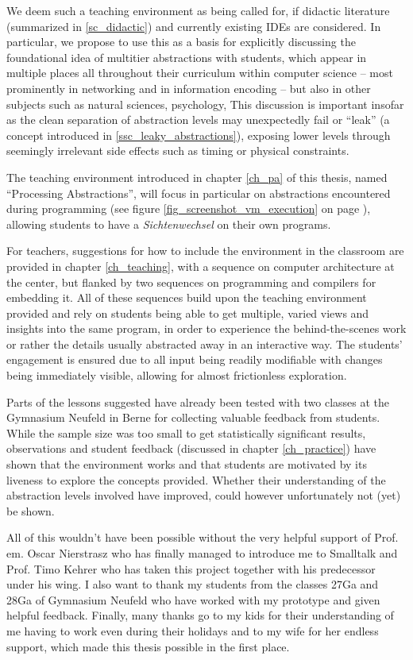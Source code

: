 We deem such a teaching environment as being called for, if didactic literature (summarized in \ref{sc_didactic}) and currently existing \acp{IDE} are considered. In particular, we propose to use this as a basis for explicitly discussing the foundational idea of multitier abstractions with students, which appear in multiple places all throughout their curriculum within computer science -- most prominently in networking and in information encoding -- but also in other subjects such as natural sciences, psychology, \etc This discussion is important insofar as the clean separation of abstraction levels may unexpectedly fail or ``leak'' (a concept introduced in \ref{ssc_leaky_abstractions}), exposing lower levels through seemingly irrelevant side effects such as timing or physical constraints.

The teaching environment introduced in chapter \ref{ch_pa} of this thesis, named ``Processing Abstractions'', will focus in particular on abstractions encountered during programming (see \eg figure \ref{fig_screenshot_vm_execution} on page \pageref{fig_screenshot_vm_execution}), allowing students to have a \emph{Sichtenwechsel} on their own programs.

For teachers, suggestions for how to include the environment in the classroom are provided in chapter \ref{ch_teaching}, with a sequence on computer architecture at the center, but flanked by two sequences on programming and compilers for embedding it. All of these sequences build upon the teaching environment provided and rely on students being able to get multiple, varied views and insights into the same program, in order to experience the behind-the-scenes work or rather the details usually abstracted away in an interactive way. The students' engagement is ensured due to all input being readily modifiable with changes being immediately visible, allowing for almost frictionless exploration.

Parts of the lessons suggested have already been tested with two classes at the Gymnasium Neufeld in Berne for collecting valuable feedback from students. While the sample size was too small to get statistically significant results, observations and student feedback (discussed in chapter \ref{ch_practice}) have shown that the environment works and that students are motivated by its liveness to explore the concepts provided. Whether their understanding of the abstraction levels involved have improved, could however unfortunately not (yet) be shown.

All of this wouldn't have been possible without the very helpful support of Prof.\,em. Oscar Nierstrasz who has finally managed to introduce me to Smalltalk and Prof. Timo Kehrer who has taken this project together with his predecessor under his wing. I also want to thank my students from the classes 27Ga and 28Ga of Gymnasium Neufeld who have worked with my prototype and given helpful feedback. Finally, many thanks go to my kids for their understanding of me having to work even during their holidays and to my wife for her endless support, which made this thesis possible in the first place.
